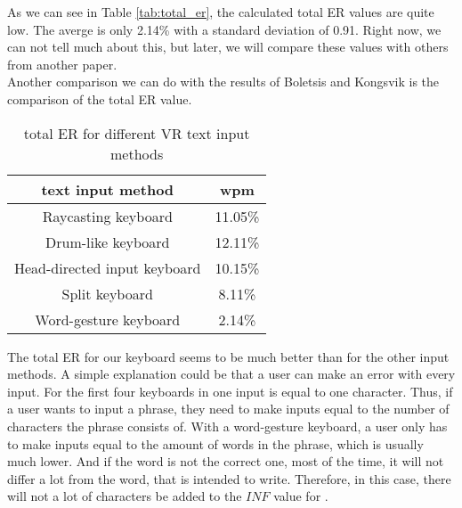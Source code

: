 As we can see in Table \ref{tab:total_er}, the calculated total ER values are quite low. The averge is only 2.14\% with a standard deviation of 0.91. Right now, we can not tell much about this, but later, we will compare these values with others from another paper.\\
Another comparison we can do with the results of Boletsis and Kongsvik \cite{Boletsis2019ControllerbasedTT} is the comparison of the total ER value.
\begin{table}[H]
    \centering
    \caption{total ER for different VR text input methods}
    \begin{tabular}{cc} \toprule
        text input method&wpm\\ \midrule
        Raycasting keyboard& 11.05\%\\
        Drum-like keyboard& 12.11\%\\
        Head-directed input keyboard& 10.15\%\\
        Split keyboard& 8.11\%\\
        Word-gesture keyboard& 2.14\%\\
        \bottomrule
    \end{tabular}
    \label{tab:total_er_compare}
\end{table}
The total ER for our keyboard seems to be much better than for the other input methods. A simple explanation could be that a user can make an error with every input. For the first four keyboards in  one input is equal to one character. Thus, if a user wants to input a phrase, they need to make inputs equal to the number of characters the phrase consists of. With a word-gesture keyboard, a user only has to make inputs equal to the amount of words in the phrase, which is usually much lower. And if the word is not the correct one, most of the time, it will not differ a lot from the word, that is intended to write. Therefore, in this case, there will not a lot of characters be added to the $INF$ value for .\\

